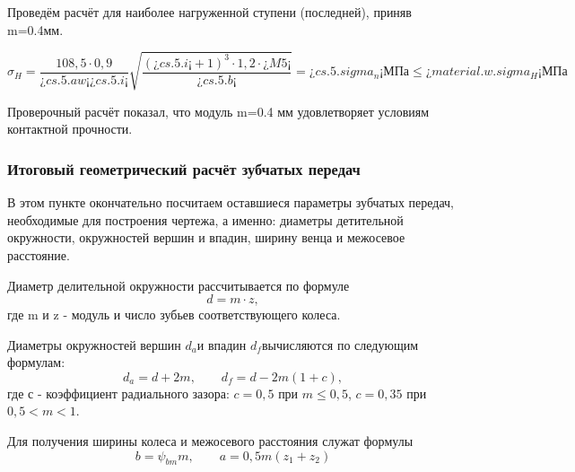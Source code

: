 \documentclass[14pt,a4paper,russian]{scrartcl}
\begin{document}
            Проведём расчёт для наиболее нагруженной ступени (последней), приняв m=0.4мм.

            \[ \sigma_H = \frac{108,5\cdot 0,9}{¿cs.5.aw¡ ¿cs.5.i¡}
            \sqrt{\frac{(¿cs.5.i¡+1)^3\cdot 1,2\cdot ¿M5¡}{¿cs.5.b¡}} = ¿cs.5.sigma_n¡ \text{МПа}\leq ¿material.w.sigma_H¡ \text{МПа}\]
            
        Проверочный расчёт показал, что модуль m=0.4 мм удовлетворяет условиям контактной прочности.

    
    \subsubsection{Итоговый геометрический расчёт зубчатых передач}
        В этом пункте окончательно посчитаем оставшиеся параметры зубчатых передач,
        необходимые для построения чертежа, а именно: диаметры детительной окружности, окружностей вершин
        и впадин, ширину венца и межосевое расстояние.\par

        Диаметр делительной окружности рассчитывается по формуле
        \[ d = m\cdot z, \]
        где m и z - модуль и число зубьев соответствующего колеса.\par

        Диаметры окружностей вершин \( d_a \)и впадин \( d_f \)вычисляются по следующим формулам:
        \[ d_a = d + 2m,\qquad d_f = d - 2m(1+c),\]
        где с - коэффициент радиального зазора: 
            \( c=0,5 \) при \( m\leq 0,5 \), \( c=0,35 \) при \( 0,5<m<1 \).
        
        Для получения ширины колеса и межосевого расстояния служат формулы
        \[ b=\psi_{bm}m, \qquad  a = 0,5m(z_1+z_2)\]
        
\end{document}
